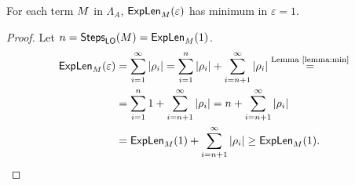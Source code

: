 \begin{corollary}
	For each term $M$ in $\Lambda_{A}$, $\textsf{ExpLen}_{M}(\varepsilon)$ has minimum in $\varepsilon=1$.
\end{corollary}
\begin{proof}
	Let $n=\textsf{Steps}_{\textsf{LO}}(M)=\textsf{ExpLen}_{M}(1)$.
	\begin{align*}
	\textsf{ExpLen}_{M}(\varepsilon)&=\sum\limits_{i=1}^{\infty} |\rho_i|=\sum\limits_{i=1}^{n} |\rho_i|+\sum\limits_{i=n+1}^{\infty} |\rho_i|\overset{\textrm{Lemma \ref{lemma:min}}}{=}\\
	&=\sum\limits_{i=1}^{n}1+\sum\limits_{i=n+1}^{\infty} |\rho_i|=n+\sum\limits_{i=n+1}^{\infty}|\rho_i|\\
	&=\textsf{ExpLen}_{M}(1)+\sum\limits_{i=n+1}^{\infty}|\rho_i|\geq \textsf{ExpLen}_{M}(1).
	\end{align*}
\end{proof}
